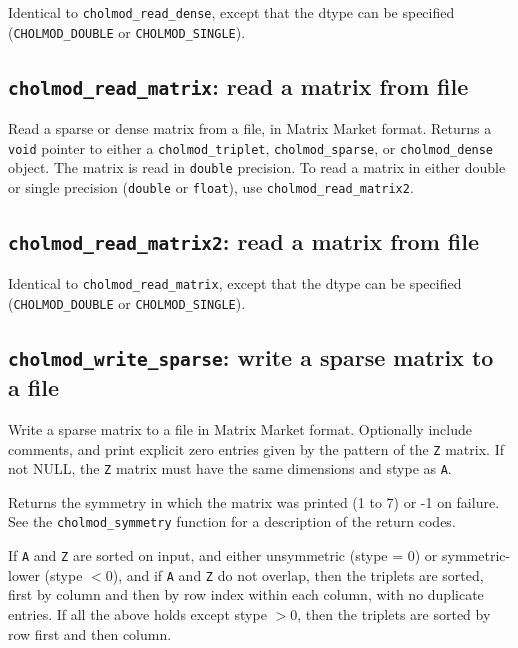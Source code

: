 \documentclass[11pt]{article}
\begin{document}

Identical to \verb'cholmod_read_dense', except that the dtype can be
specified (\verb'CHOLMOD_DOUBLE' or \verb'CHOLMOD_SINGLE').

\subsection{{\tt cholmod\_read\_matrix}: read a matrix from file}


Read a sparse or dense matrix from a file, in Matrix Market format.  Returns a
{\tt void} pointer to either a {\tt cholmod\_triplet}, {\tt cholmod\_sparse},
or {\tt cholmod\_dense} object.
%
The matrix is read in {\tt double} precision.  To read a matrix
in either double or single precision ({\tt double} or {\tt float}),
use \verb'cholmod_read_matrix2'.

\subsection{{\tt cholmod\_read\_matrix2}: read a matrix from file}


Identical to \verb'cholmod_read_matrix', except that the dtype can be
specified (\verb'CHOLMOD_DOUBLE' or \verb'CHOLMOD_SINGLE').

\subsection{{\tt cholmod\_write\_sparse}: write a sparse matrix to a file}


Write a sparse matrix to a file in Matrix Market format.   Optionally include
comments, and print explicit zero entries given by the pattern of the {\tt Z}
matrix.  If not NULL, the {\tt Z} matrix must have the same dimensions and stype
as {\tt A}.

Returns the symmetry in which the matrix was printed (1 to 7) or -1 on failure.
See the {\tt cholmod\_symmetry} function for a description of the return codes.

If {\tt A} and {\tt Z} are sorted on input, and either unsymmetric (stype = 0)
or symmetric-lower (stype $< 0$), and if {\tt A} and {\tt Z} do not overlap,
then the triplets are sorted, first by column and then by row index within each
column, with no duplicate entries.  If all the above holds except stype $> 0$,
then the triplets are sorted by row first and then column.
\end{document}
